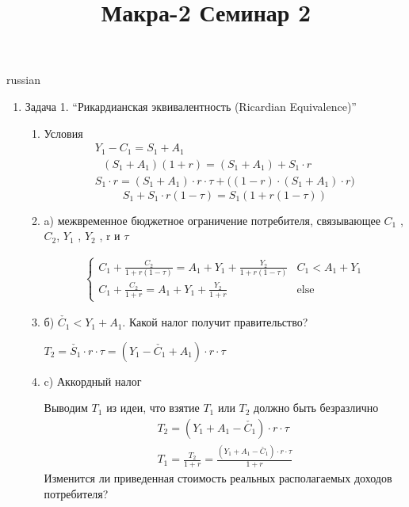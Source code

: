\documentclass{article}
\begin{document}
\title{\foreignlanguage{russian}{Макра-2 Семинар 2}}
\maketitle
\begin{otherlanguage*}{russian}

\begin{enumerate}
\item Задача 1. “Рикардианская эквивалентность (Ricardian Equivalence)”
\begin{enumerate}
\item Условия
\begin{align}
Y_1 - C_1 = S_1 + A_1 \\
\,\,\,\,(S_1 + A_1) (1 + r) = (S_1 + A_1) + S_1 \cdot r \\
S_1 \cdot r = (S_1 + A_1) \cdot r \cdot \tau + \big( (1 - r) \cdot (S_1+ A_1) \cdot r \big)
\end{align}
\begin{equation}
S_1 + S_1 \cdot r (1 - \tau) = S_1 ( 1 + r (1 - \tau)) 
\end{equation}

\item a) межвременное бюджетное ограничение потребителя, связывающее $C_1$ , $C_2$, $Y_1$ , $Y_2$ , r и $\tau$

\begin{align}
\begin{cases}
C_1 + \frac{C_2}{1 + r (1 - \tau)} = A_1 + Y_1 + \frac{Y_2}{1 + r ( 1 - \tau) } & C_1 < A_1 + Y_1 \\
C_1 + \frac{C_2}{1 + r} = A_1 + Y_1 + \frac{Y_2}{1 + r} & \operatorname{else} 
\end{cases}
\end{align}

\item б) $\check{C_1} < Y_1 + A_1 $. Какой налог получит правительство?


$ T_2 = \check{S_1} \cdot r \cdot \tau  = (Y_1 - \check{C_1} + A_1) \cdot r \cdot \tau $ 

\item c) Аккордный налог 

Выводим $ T_1 $ из идеи, что взятие $ T_1 $ или $ T_2 $ должно быть безразлично  
\begin{align}
T_2 = (Y_1 + A_1 - \check{C_1}) \cdot r \cdot \tau \\
T_1 = \frac{T_2}{1 + r} = \frac{(Y_1 + A_1 - \check{C_1}) \cdot r \cdot \tau }{1 + r }
\end{align}
Изменится ли приведенная стоимость реальных располагаемых доходов потребителя? 


\end{enumerate}
\end{enumerate}
\end{otherlanguage*}
\end{document}

